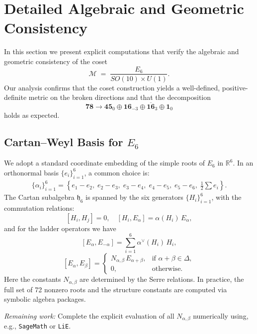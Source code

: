 \documentclass[aps,prd,preprint,groupedaddress]{revtex4-2}
\begin{document}
\appendix

\section{Detailed Algebraic and Geometric Consistency}
\label{sec:alg_geo_consistency}

In this section we present explicit computations that verify the algebraic and geometric consistency of the coset
\[
\mathcal{M} \;=\; \frac{E_6}{SO(10)\times U(1)}.
\]
Our analysis confirms that the coset construction yields a well-defined, positive-definite metric on the broken directions and that the decomposition
\[
\mathbf{78} \to \mathbf{45}_0 \oplus \mathbf{16}_{-3} \oplus \overline{\mathbf{16}}_{3} \oplus \mathbf{1}_0
\]
holds as expected.

\subsection{Cartan--Weyl Basis for \(E_6\)}
We adopt a standard coordinate embedding of the simple roots of \(E_6\) in \(\mathbb{R}^6\). In an orthonormal basis \(\{e_i\}_{i=1}^6\), a common choice is:
\begin{align*}
\{\alpha_i\}_{i=1}^6 = \left\{
  e_1 - e_2, \;
  e_2 - e_3, \;
  e_3 - e_4, \;
  e_4 - e_5, \;
  e_5 - e_6, \;
  \frac{1} {2} \sum e_i
\right\}.
\end{align*}
The Cartan subalgebra \(\mathfrak{h}_6\) is spanned by the six generators \(\{H_i\}_{i=1}^6\), with the commutation relations:
\[
[H_i, H_j] = 0, \quad
[H_i, E_\alpha] = \alpha(H_i)\,E_\alpha,
\]
and for the ladder operators we have
\[
[E_\alpha, E_{-\alpha}] = \sum_{i=1}^{6} \alpha^\vee(H_i)\,H_i,
\]
\[
[E_\alpha, E_\beta] =
\begin{cases}
N_{\alpha,\beta}\,E_{\alpha+\beta}, & \text{if } \alpha+\beta \in \Delta,\\[1mm]
0, & \text{otherwise}.
\end{cases}
\]
Here the constants \(N_{\alpha,\beta}\) are determined by the Serre relations. In practice, the full set of 72 nonzero roots and the structure constants are computed via symbolic algebra packages.

\emph{Remaining work:} Complete the explicit evaluation of all \(N_{\alpha,\beta}\) numerically using, e.g., \texttt{SageMath} or \texttt{LiE}.
\end{document}
